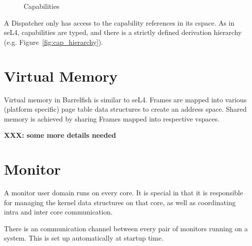 \documentclass[a4paper,twoside]{report} %
\begin{document}
 
\begin{figure}
  \centering
  \quad
  \caption{Capabilities}
  \label{fig:caps}
\end{figure}

A Dispatcher only has access to the capability references in its cspace. As in
seL4, capabilities are typed, and there is a strictly defined derivation
hierarchy (e.g. Figure~\ref{fig:cap_hierarchy}).

\section{Virtual Memory}
Virtual memory in Barrelfish is similar to seL4. Frames are mapped into various
(platform specific) page table data structures to create an address
space. Shared memory is achieved by sharing Frames mapped into respective
vspaces.

\textbf{XXX: some more details needed}

\section{Monitor}
A monitor user domain runs on every core. It is special in that it is
responsible for managing the kernel data structures on that core, as well as
coordinating intra and inter core communication.

There is an communication channel between every pair of monitors running on a
system. This is set up automatically at startup time.
\end{document}
